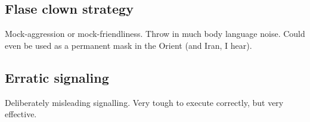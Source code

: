 \documentclass[oneside, article]{memoir}
\begin{document}
\subsection{Flase clown strategy}
\subitem Mock-aggression or mock-friendliness.
\subitem Throw in much body language noise.
\subitem Could even be used as a permanent mask in the Orient (and Iran, I hear).

\subsection{Erratic signaling}
\subitem Deliberately misleading signalling.
\subitem Very tough to execute correctly, but very effective.
\end{document}
